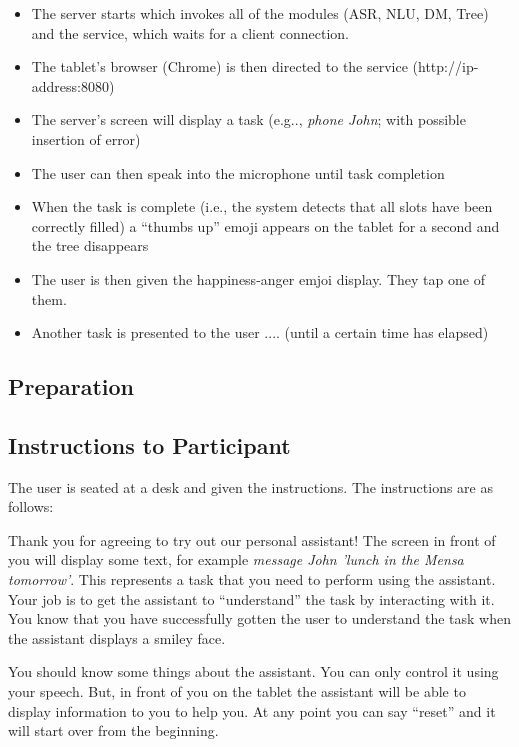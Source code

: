 \documentclass[a4paper,10pt]{article}
\begin{document}
\begin{itemize}
 \item The server starts which invokes all of the modules (ASR, NLU, DM, Tree) and the service, which waits for a client connection. 
 \item The tablet's browser (Chrome) is then directed to the service (http://ip-address:8080)
 \item The server's screen will display a task (e.g.., \emph{phone John}; with possible insertion of error)
 \item The user can then speak into the microphone until task completion
 \item When the task is complete (i.e., the system detects that all slots have been correctly filled) a ``thumbs up'' emoji appears on the tablet for a second and the tree disappears
 \item The user is then given the happiness-anger emjoi display. They tap one of them. 
 \item Another task is presented to the user .... (until a certain time has elapsed)
\end{itemize}



\subsection{Preparation}



\subsection{Instructions to Participant}

The user is seated at a desk and given the instructions. The instructions are as follows:

Thank you for agreeing to try out our personal assistant! The screen in front of you will display some text, for example \emph{message John 'lunch in the Mensa tomorrow'}. This represents a task that you need to perform using the assistant. Your job is to get the assistant to ``understand'' the task by interacting with it. You know that you have successfully gotten the user to understand the task when the assistant displays a smiley face. 

You should know some things about the assistant. You can only control it using your speech. But, in front of you on the tablet the assistant will be able to display information to you to help you. At any point you can say ``reset'' and it will start over from the beginning. 
\end{document}
